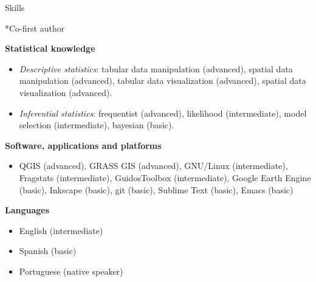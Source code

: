 \documentclass{resume}
\begin{document}
\begin{rSection}{Skills}
\begin{itemize}
\end{itemize} 

*Co-first author

{\bf Statistical knowledge}

\begin{itemize} 
\item {\it Descriptive statistics}: tabular data manipulation (advanced), spatial data manipulation (advanced), tabular data visualization (advanced), spatial data visualization (advanced).

\item {\it Inferential statistics}: frequentist (advanced), likelihood (intermediate), model selection (intermediate), bayesian (basic).
\end{itemize}

{\bf Software, applications and platforms}
\begin{itemize}
\item QGIS (advanced), GRASS GIS (advanced), GNU/Linux (intermediate), Fragstats (intermediate), GuidosToolbox (intermediate), Google Earth Engine (basic), Inkscape (basic), git (basic), Sublime Text (basic), Emacs (basic)
\end{itemize}

{\bf Languages}
\begin{itemize}
\item English (intermediate)
\item Spanish (basic)
\item Portuguese (native speaker)
\end{itemize}

\end{rSection}

\end{document}
